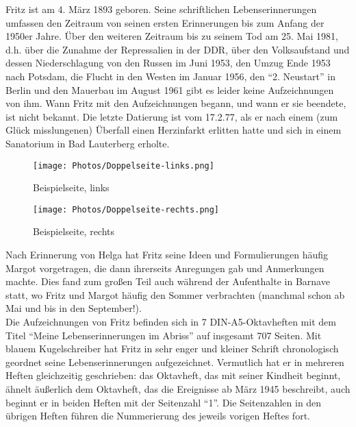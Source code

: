 Fritz ist am 4. März 1893 geboren. Seine schriftlichen Lebenserinnerungen umfassen den Zeitraum von seinen ersten Erinnerungen bis zum Anfang der 1950er Jahre. Über den weiteren Zeitraum bis zu seinem Tod am 25. Mai 1981, d.h. über die Zunahme der Repressalien in der DDR, über den Volksaufstand und dessen Niederschlagung von den Russen im Juni 1953, den Umzug Ende 1953 nach Potsdam, die Flucht in den Westen im Januar 1956, den \enquote{2. Neustart} in Berlin und den Mauerbau im August 1961 gibt es leider keine Aufzeichnungen von ihm. Wann Fritz mit den Aufzeichnungen begann, und wann er sie beendete, ist nicht bekannt. Die letzte Datierung ist vom 17.2.77, als er nach einem (zum Glück misslungenen) Überfall einen Herzinfarkt erlitten hatte und sich in einem Sanatorium in Bad Lauterberg erholte.

\begin{figure}[p]
	\texttt{[image: Photos/Doppelseite-links.png]}
	\caption{Beispielseite, links}
	\label{fig:doppelseite_links}
\end{figure}

\begin{figure}[p]
	\texttt{[image: Photos/Doppelseite-rechts.png]}
	\caption{Beispielseite, rechts}
	\label{fig:doppelseite_rechts}
\end{figure}

Nach Erinnerung von Helga hat Fritz seine Ideen und Formulierungen häufig Margot vorgetragen, die dann ihrerseits Anregungen gab und Anmerkungen machte. Dies fand zum großen Teil auch während der Aufenthalte in Barnave statt, wo Fritz und Margot häufig den Sommer verbrachten (manchmal schon ab Mai und bis in den September!).\\

Die Aufzeichnungen von Fritz befinden sich in 7 DIN-A5-Oktavheften mit dem Titel \enquote{Meine Lebenserinnerungen im Abriss} auf insgesamt 707 Seiten. Mit blauem Kugelschreiber hat Fritz in sehr enger und kleiner Schrift chronologisch geordnet seine Lebenserinnerungen aufgezeichnet. Vermutlich hat er in mehreren Heften gleichzeitig geschrieben: das Oktavheft, das mit seiner Kindheit beginnt, ähnelt äußerlich dem Oktavheft, das die Ereignisse ab März 1945 beschreibt, auch beginnt er in beiden Heften mit der Seitenzahl \enquote{1}. Die Seitenzahlen in den übrigen Heften führen die Nummerierung des jeweils vorigen Heftes fort.

